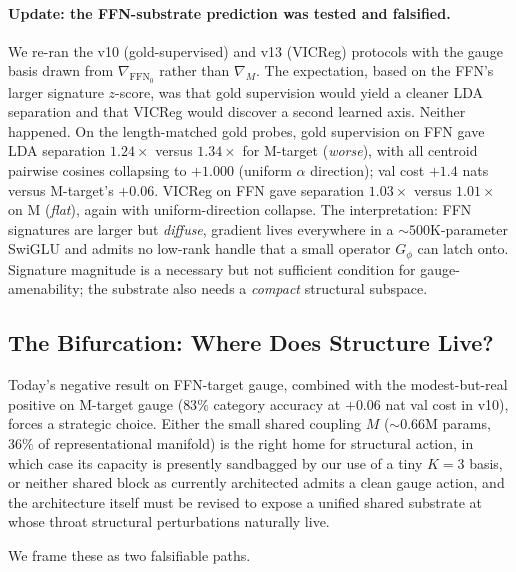 \documentclass[11pt, a4paper]{article}
\theoremstyle{plain}
\theoremstyle{definition}
\theoremstyle{remark}
\begin{document}
\paragraph{Update: the FFN-substrate prediction was tested and falsified.}
We re-ran the v10 (gold-supervised) and v13 (VICReg) protocols with the gauge basis drawn from $\nabla_{\mathrm{FFN}_0}$ rather than $\nabla_M$.
The expectation, based on the FFN's larger signature $z$-score, was that gold supervision would yield a cleaner LDA separation and that VICReg would discover a second learned axis.
Neither happened.
On the length-matched gold probes, gold supervision on FFN gave LDA separation $1.24\times$ versus $1.34\times$ for M-target (\emph{worse}), with all centroid pairwise cosines collapsing to $+1.000$ (uniform $\alpha$ direction); val cost $+1.4$ nats versus M-target's $+0.06$.
VICReg on FFN gave separation $1.03\times$ versus $1.01\times$ on M (\emph{flat}), again with uniform-direction collapse.
The interpretation: FFN signatures are larger but \emph{diffuse}, gradient lives everywhere in a $\sim 500$K-parameter SwiGLU and admits no low-rank handle that a small operator $G_\phi$ can latch onto.
Signature magnitude is a necessary but not sufficient condition for gauge-amenability; the substrate also needs a \emph{compact} structural subspace.

\subsection{The Bifurcation: Where Does Structure Live?}
\label{sec:bifurcation}

Today's negative result on FFN-target gauge, combined with the modest-but-real positive on M-target gauge ($83\%$ category accuracy at $+0.06$ nat val cost in v10), forces a strategic choice.
Either the small shared coupling $M$ ($\sim$0.66M params, $36\%$ of representational manifold) is the right home for structural action, in which case its capacity is presently sandbagged by our use of a tiny $K=3$ basis, or neither shared block as currently architected admits a clean gauge action, and the architecture itself must be revised to expose a unified shared substrate at whose throat structural perturbations naturally live.

We frame these as two falsifiable paths.
\end{document}

